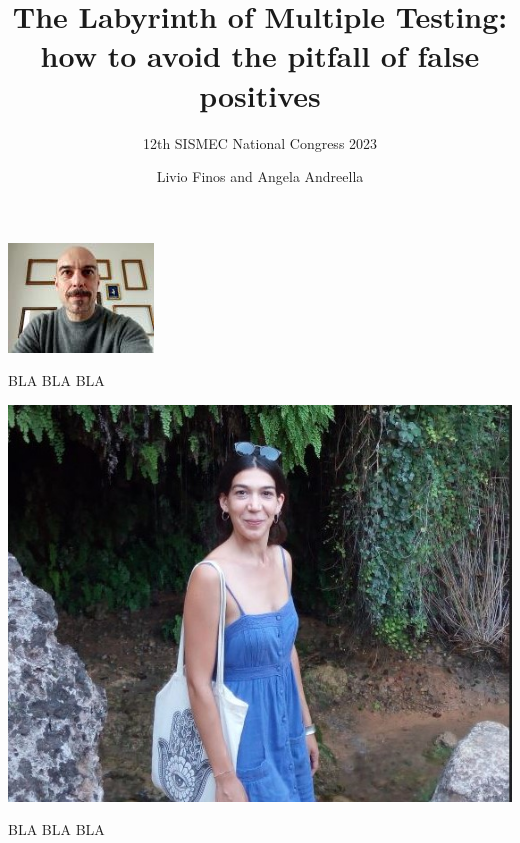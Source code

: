 \documentclass[xcolor={pdftex,dvipsnames,table}]{beamer}
\title[]{The Labyrinth of Multiple Testing: how to avoid the pitfall of false positives}
\subtitle{12th SISMEC National Congress 2023}
\author[\hspace{5cm}]{Livio Finos and Angela Andreella}
\date{}
\begin{document}
\begin{frame}
  \titlepage
\end{frame}

\begin{frame}
    \begin{minipage}[t]{0.45\textwidth}
\includegraphics[width= \textwidth]{Slides/MTP/plaatjes/Finos.jpg}

BLA BLA BLA
\end{minipage}\hfill
\begin{minipage}[t]{0.45\textwidth}
  \includegraphics[width= .95\textwidth]{Slides/MTP/plaatjes/Andreella.jpg}

  BLA BLA BLA

\end{minipage}
\end{frame}
\end{document}
